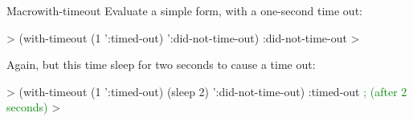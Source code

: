 \begin{functiondoc}{Macro}{with-timeout}{\code{(} 
    \superstar{}\code{)}
    \superstar{} 
    \returns{} \superstar}
\fnexamples
Evaluate a simple form, with a one-second time out:
%
\W\supp
\begin{example}
  > (with-timeout (1 ':timed-out) 
       ':did-not-time-out)
  :did-not-time-out
  >
\end{example}
%
Again, but this time sleep for two seconds to cause a time out:
%
\W\supp\notpretop
\begin{example}
  > (with-timeout (1 ':timed-out)
       (sleep 2) 
       ':did-not-time-out)
  :timed-out              \textrm{\textcolor{green}{; (after 2 seconds)}}
  >
\end{example}

\end{functiondoc}


